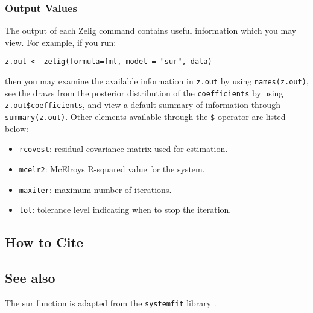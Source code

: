 \subsubsection{Output Values}
The output of each Zelig command contains useful information which you may
view. For example, if you run:
\begin{verbatim}
z.out <- zelig(formula=fml, model = "sur", data)
\end{verbatim}
\noindent then you may examine the available information in \texttt{z.out} by
using \texttt{names(z.out)}, see the draws from the posterior distribution of
the \texttt{coefficients} by using \texttt{z.out\$coefficients}, and view a default
summary of information through \texttt{summary(z.out)}. Other elements
available through the \texttt{\$} operator are listed below:
\begin{itemize}
\item \texttt{rcovest}: residual covariance matrix used for estimation.
\item \texttt{mcelr2}: McElroys R-squared value for the system.
\end{itemize}

\begin{itemize}
\item \texttt{maxiter}: maximum number of iterations.
\item \texttt{tol}: tolerance level indicating when to stop the iteration.
\end{itemize}

\subsection* {How to Cite} 




\subsection* {See also}
The sur function is adapted from the \texttt{systemfit} library
\citep{HamHen05}.
